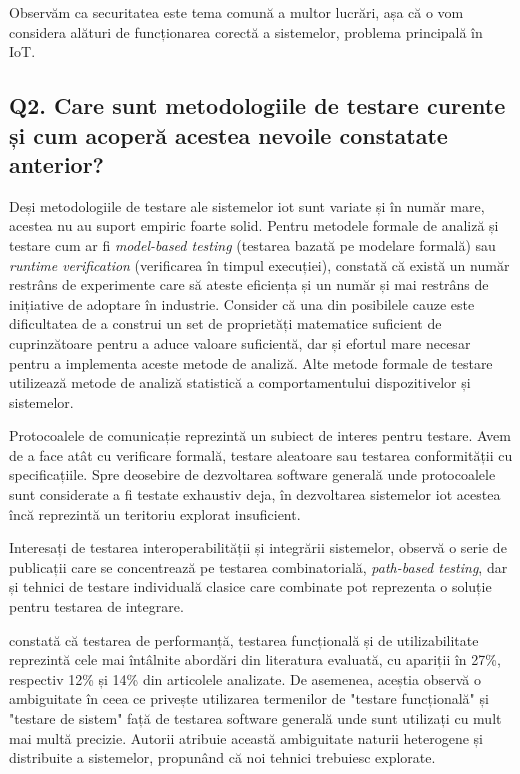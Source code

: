 Observăm ca securitatea este tema comună a multor lucrări, așa că o vom considera alături de funcționarea corectă a sistemelor, problema principală în IoT.


\subsection*{Q2. Care sunt metodologiile de testare curente și cum acoperă acestea nevoile constatate anterior?}

Deși metodologiile de testare ale sistemelor \acrshort{iot} sunt variate și în număr mare, acestea nu au suport empiric foarte solid. Pentru metodele formale de analiză și testare cum ar fi \textit{model-based testing} (testarea bazată pe modelare formală) sau \textit{runtime verification} (verificarea în timpul execuției), \cite{Ahmed2019} constată că există un număr restrâns de experimente care să ateste eficiența și un număr și mai restrâns de inițiative de adoptare în industrie. Consider că una din posibilele cauze este dificultatea de a construi un set de proprietăți matematice suficient de cuprinzătoare pentru a aduce valoare suficientă, dar și efortul mare necesar pentru a implementa aceste metode de analiză. Alte metode formale de testare utilizează metode de analiză statistică a comportamentului dispozitivelor și sistemelor. 

Protocoalele de comunicație reprezintă un subiect de interes pentru testare. Avem de a face atât cu verificare formală, testare aleatoare sau testarea conformității cu specificațiile. Spre deosebire de dezvoltarea software generală unde protocoalele sunt considerate a fi testate exhaustiv deja, în dezvoltarea sistemelor \acrshort{iot} acestea încă reprezintă un teritoriu explorat insuficient. 

Interesați de testarea interoperabilității și integrării sistemelor, \cite{Bures2020} observă o serie de publicații care se concentrează pe testarea combinatorială, \textit{path-based testing}, dar și tehnici de testare individuală clasice care combinate pot reprezenta o soluție pentru testarea de integrare. 

\cite{Corts2019} constată că testarea de performanță, testarea funcțională și de utilizabilitate reprezintă cele mai întâlnite abordări din literatura evaluată, cu apariții în 27\%, respectiv 12\% și 14\% din articolele analizate. De asemenea, aceștia observă o ambiguitate în ceea ce privește utilizarea termenilor de "testare funcțională" și "testare de sistem" față de testarea software generală unde sunt utilizați cu mult mai multă precizie. Autorii atribuie această ambiguitate naturii heterogene și distribuite a sistemelor, propunând că noi tehnici trebuiesc explorate. 


